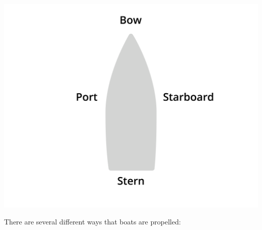 \begin{center}
    \includegraphics[width=.75\textwidth]{bowStern.png}
    
\end{center}
There are several different ways that boats are propelled:

